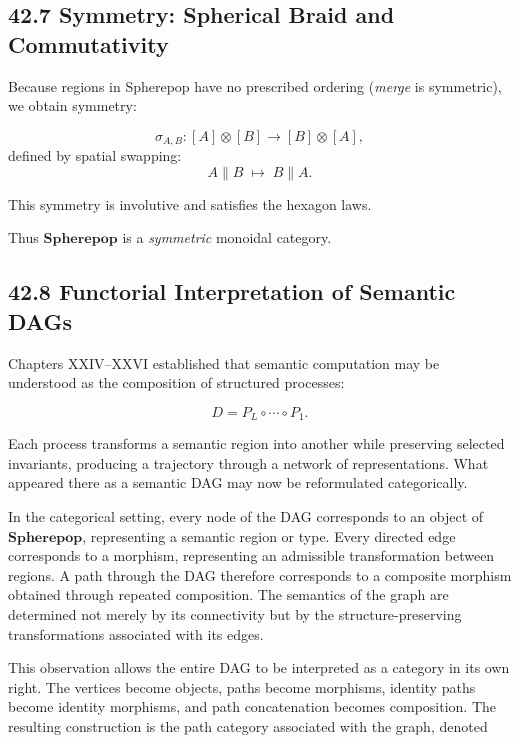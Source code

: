 \documentclass[12pt,letterpaper]{article}
\theoremstyle{remark}
\begin{document}
\subsection{42.7 Symmetry: Spherical Braid and Commutativity}

Because regions in Spherepop have no prescribed ordering (\emph{merge} is symmetric), we obtain symmetry:

\[
\sigma_{A,B} : [A] \otimes [B] \to [B] \otimes [A],
\]
defined by spatial swapping:
\[
A \parallel B \;\mapsto\; B \parallel A.
\]

This symmetry is involutive and satisfies the hexagon laws.

Thus $\mathbf{Spherepop}$ is a \emph{symmetric} monoidal category.

\subsection{42.8 Functorial Interpretation of Semantic DAGs}

Chapters XXIV--XXVI established that semantic computation may be understood as the composition of structured processes:

\[
D = P_L \circ \cdots \circ P_1.
\]

Each process transforms a semantic region into another while preserving selected invariants, producing a trajectory through a network of representations. What appeared there as a semantic DAG may now be reformulated categorically.

In the categorical setting, every node of the DAG corresponds to an object of $\mathbf{Spherepop}$, representing a semantic region or type. Every directed edge corresponds to a morphism, representing an admissible transformation between regions. A path through the DAG therefore corresponds to a composite morphism obtained through repeated composition. The semantics of the graph are determined not merely by its connectivity but by the structure-preserving transformations associated with its edges.

This observation allows the entire DAG to be interpreted as a category in its own right. The vertices become objects, paths become morphisms, identity paths become identity morphisms, and path concatenation becomes composition. The resulting construction is the path category associated with the graph, denoted
\end{document}
